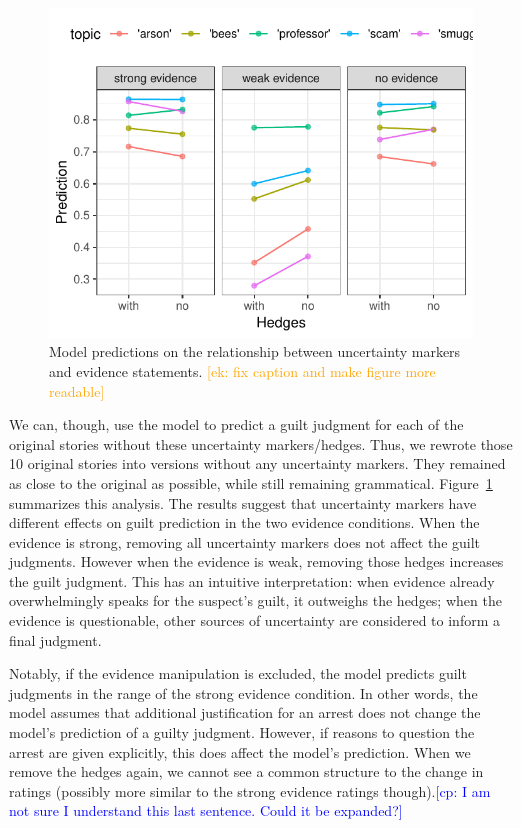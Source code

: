 \documentclass[11pt,a4paper]{article}
\newcommand{\ek}[1]{\textcolor{Orange}{[ek: #1]}}
\newcommand{\cp}[1]{\textcolor{Blue}{[cp: #1]}}
\begin{document}
\begin{figure}
	\includegraphics[width=1\linewidth]{graphs/hedges.pdf}
	\caption{Model predictions on the relationship between uncertainty markers and evidence statements. \ek{fix caption and make figure more readable}}
	\label{fig:hedges}
\end{figure}


We can, though, use the model to predict a guilt judgment for each of the original stories without these uncertainty markers/hedges. Thus, we rewrote those 10 original stories into versions without any uncertainty markers. They remained as close to the original as possible, while still remaining grammatical.
Figure~\ref{fig:hedges} summarizes this analysis. The results suggest that uncertainty markers have different effects on guilt prediction in the two evidence conditions. When the evidence is strong, removing all uncertainty markers does not affect the guilt judgments. However when the evidence is weak, removing those hedges increases the guilt judgment. This has an intuitive interpretation: when evidence already overwhelmingly speaks for the suspect's guilt, it outweighs the hedges; when  the evidence is questionable, other sources of uncertainty are considered to inform a final judgment.

Notably, if the evidence manipulation is excluded, the model predicts guilt judgments in the range of the strong evidence condition. In other words, the model assumes that additional justification for an arrest does not change the model's prediction of a guilty judgment. However, if reasons to question the arrest are given explicitly, this does affect the model's prediction. When we remove the hedges again, we cannot see a common structure to the change in ratings (possibly more similar to the strong evidence ratings though).\cp{I am not sure I understand this last sentence. Could it be expanded?}
\end{document}
